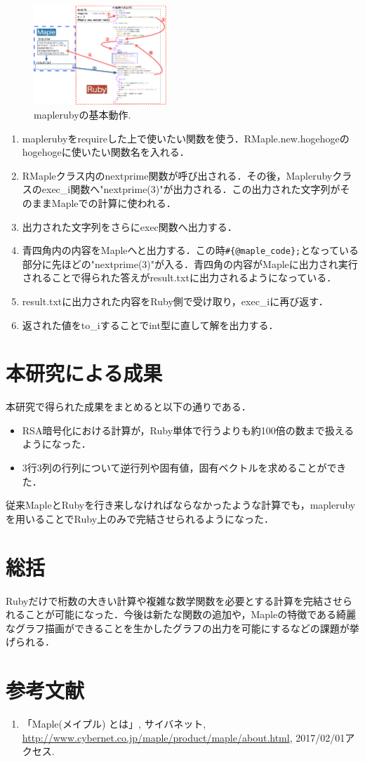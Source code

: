 \documentclass[10pt,a4j,twocolumn]{jsarticle}
\begin{document}
\begin{figure}[htbp]\begin{center}
\includegraphics[width=5cm,bb=0 0 546 408]{./mapleruby_003.png}
\caption{maplerubyの基本動作.}
\label{default}\end{center}\end{figure}
\begin{enumerate}
\item maplerubyをrequireした上で使いたい関数を使う．RMaple.new.hogehogeのhogehogeに使いたい関数名を入れる．
\item RMapleクラス内のnextprime関数が呼び出される．その後，Maplerubyクラスのexec\_i関数へ"nextprime(3)"が出力される．この出力された文字列がそのままMapleでの計算に使われる．
\item 出力された文字列をさらにexec関数へ出力する．
\item 青四角内の内容をMapleへと出力する．この時\verb|#{@maple_code};|となっている部分に先ほどの"nextprime(3)"が入る．青四角の内容がMapleに出力され実行されることで得られた答えがresult.txtに出力されるようになっている．
\item result.txtに出力された内容をRuby側で受け取り，exec\_iに再び返す．
\item 返された値をto\_iすることでint型に直して解を出力する．
\end{enumerate}
\section{本研究による成果}
本研究で得られた成果をまとめると以下の通りである．

\begin{itemize}
\item RSA暗号化における計算が，Ruby単体で行うよりも約100倍の数まで扱えるようになった．
\item 3行3列の行列について逆行列や固有値，固有ベクトルを求めることができた．
\end{itemize}
従来MapleとRubyを行き来しなければならなかったような計算でも，maplerubyを用いることでRuby上のみで完結させられるようになった．

\section{総括}
Rubyだけで桁数の大きい計算や複雑な数学関数を必要とする計算を完結させられることが可能になった．今後は新たな関数の追加や，Mapleの特徴である綺麗なグラフ描画ができることを生かしたグラフの出力を可能にするなどの課題が挙げられる．

\section*{参考文献}
\begin{enumerate}
\item「Maple(メイプル) とは」, サイバネット, \url{http://www.cybernet.co.jp/maple/product/maple/about.html}, 2017/02/01アクセス.
\end{enumerate}
\end{document}
